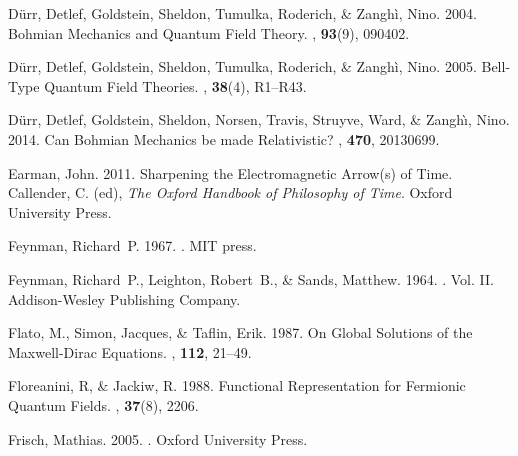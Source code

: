 \documentclass[onecolumn,secnumarabic,amsmath,amssymb,balancelastpage,nofootinbib]{article}
\begin{document}
\begin{thebibliography}{}
D{\"u}rr, Detlef, Goldstein, Sheldon, Tumulka, Roderich, \& Zangh\`{i}, Nino.
  2004.
\newblock Bohmian Mechanics and Quantum Field Theory.
, {\bf 93}(9), 090402.

D{\"u}rr, Detlef, Goldstein, Sheldon, Tumulka, Roderich, \& Zangh\`{i}, Nino.
  2005.
\newblock Bell-Type Quantum Field Theories.
, {\bf 38}(4),
  R1--R43.

D\"{u}rr, Detlef, Goldstein, Sheldon, Norsen, Travis, Struyve, Ward, \&
  Zangh\`{\i}, Nino. 2014.
\newblock Can Bohmian Mechanics be made Relativistic?
, {\bf 470}, 20130699.

Earman, John. 2011.
\newblock Sharpening the Electromagnetic Arrow(s) of Time.
 Callender, C. (ed), {\em The Oxford
  Handbook of Philosophy of Time}.
\newblock Oxford University Press.

Feynman, Richard~P. 1967.
.
\newblock MIT press.

Feynman, Richard~P., Leighton, Robert~B., \& Sands, Matthew. 1964.
.
\newblock  Vol. II.
\newblock Addison-Wesley Publishing Company.

Flato, M., Simon, Jacques, \& Taflin, Erik. 1987.
\newblock On Global Solutions of the Maxwell-Dirac Equations.
, {\bf 112}, 21--49.

Floreanini, R, \& Jackiw, R. 1988.
\newblock Functional Representation for Fermionic Quantum Fields.
, {\bf 37}(8), 2206.

Frisch, Mathias. 2005.
.
\newblock Oxford University Press.


\end{thebibliography}
\end{document}
